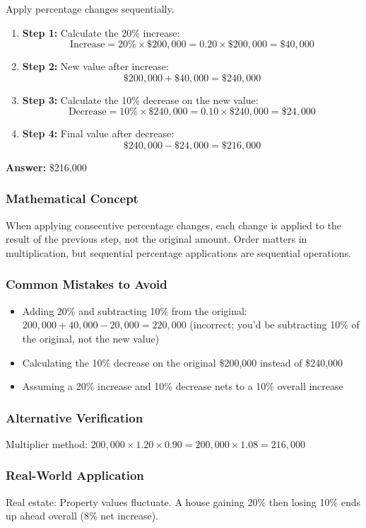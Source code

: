 \documentclass[12pt]{article}
\begin{document}
Apply percentage changes sequentially.

\begin{enumerate}
\item \textbf{Step 1:} Calculate the 20\% increase:
  \[
  \text{Increase} = 20\% \times \$200,000 = 0.20 \times \$200,000 = \$40,000
  \]
\item \textbf{Step 2:} New value after increase:
  \[
  \$200,000 + \$40,000 = \$240,000
  \]
\item \textbf{Step 3:} Calculate the 10\% decrease on the new value:
  \[
  \text{Decrease} = 10\% \times \$240,000 = 0.10 \times \$240,000 = \$24,000
  \]
\item \textbf{Step 4:} Final value after decrease:
  \[
  \$240,000 - \$24,000 = \$216,000
  \]
\end{enumerate}

\textbf{Answer: } \$216,000

\subsubsection*{Mathematical Concept}
When applying consecutive percentage changes, each change is applied to the result of the previous step, not the original amount. Order matters in multiplication, but sequential percentage applications are sequential operations.

\subsubsection*{Common Mistakes to Avoid}
\begin{itemize}
\item Adding 20\% and subtracting 10\% from the original: $200,000 + 40,000 - 20,000 = 220,000$ (incorrect; you'd be subtracting 10\% of the original, not the new value)
\item Calculating the 10\% decrease on the original \$200,000 instead of \$240,000
\item Assuming a 20\% increase and 10\% decrease nets to a 10\% overall increase
\end{itemize}

\subsubsection*{Alternative Verification}
Multiplier method: $200,000 \times 1.20 \times 0.90 = 200,000 \times 1.08 = 216,000$ 

\subsubsection*{Real-World Application}
Real estate: Property values fluctuate. A house gaining 20\% then losing 10\% ends up ahead overall (8\% net increase).
\end{document}
